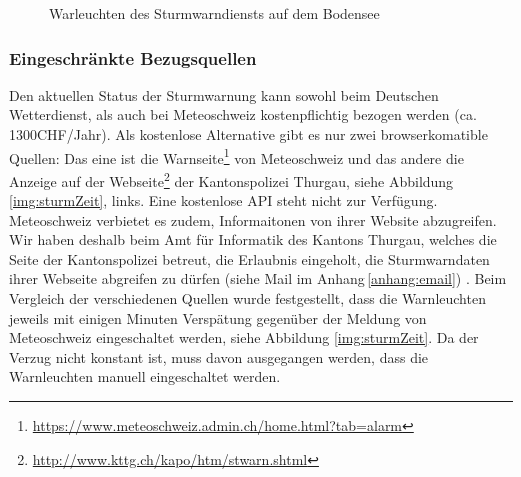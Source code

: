 \begin{figure}[htbp!]
	\centering
	\caption{Warleuchten des Sturmwarndiensts auf dem Bodensee}
	\label{img:sturm2}
\end{figure}



\subsubsection{Eingeschränkte Bezugsquellen}
Den aktuellen Status der Sturmwarnung kann sowohl beim Deutschen Wetterdienst, als auch bei Meteoschweiz kostenpflichtig bezogen werden (ca. 1300CHF/Jahr). Als kostenlose Alternative gibt es nur zwei browserkomatible Quellen: Das eine ist die Warnseite\footnote{ \url{https://www.meteoschweiz.admin.ch/home.html?tab=alarm}}  von Meteoschweiz und das andere die Anzeige auf der Webseite\footnote{ \url{http://www.kttg.ch/kapo/htm/stwarn.shtml}} der Kantonspolizei Thurgau, siehe Abbildung \ref{img:sturmZeit}, links. Eine kostenlose API steht nicht zur Verfügung. Meteoschweiz verbietet es zudem, Informaitonen von ihrer Website abzugreifen. Wir haben deshalb beim Amt für Informatik des Kantons Thurgau, welches die Seite der Kantonspolizei betreut, die Erlaubnis eingeholt, die Sturmwarndaten ihrer Webseite abgreifen zu dürfen (siehe Mail im Anhang\,\ref{anhang:email}) . Beim Vergleich der verschiedenen Quellen wurde festgestellt, dass die Warnleuchten jeweils mit einigen Minuten Verspätung gegenüber der Meldung von Meteoschweiz eingeschaltet werden, siehe Abbildung \ref{img:sturmZeit}. Da der Verzug nicht konstant ist, muss davon ausgegangen werden, dass die Warnleuchten manuell eingeschaltet werden.\\

